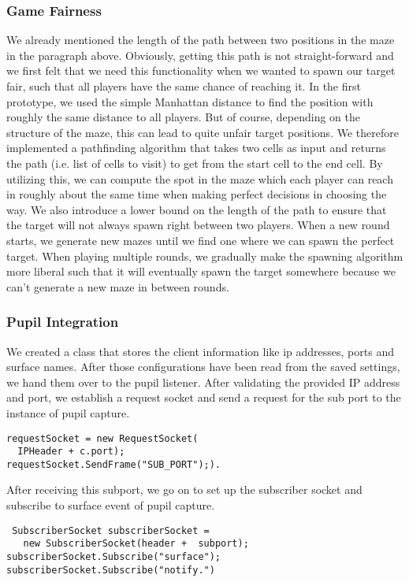 \documentclass{sigchi}
\begin{document}
\subsubsection{Game Fairness}
We already mentioned the length of the path between two positions in the maze in the paragraph above. Obviously, getting this path is not straight-forward and we first felt that we need this functionality when we wanted to spawn our target fair, such that all players have the same chance of reaching it. In the first prototype, we used the simple Manhattan distance to find the position with roughly the same distance to all players. But of course, depending on the structure of the maze, this can lead to quite unfair target positions. We therefore implemented a pathfinding algorithm that takes two cells as input and returns the path (i.e. list of cells to visit) to get from the start cell to the end cell. By utilizing this, we can compute the spot in the maze which each player can reach in roughly about the same time when making perfect decisions in choosing the way. We also introduce a lower bound on the length of the path to ensure that the target will not always spawn right between two players. When a new round starts, we generate new mazes until we find one where we can spawn the perfect target. When playing multiple rounds, we gradually make the spawning algorithm more liberal such that it will eventually spawn the target somewhere because we can't generate a new maze in between rounds.

\subsubsection{Pupil Integration}
We created a class that stores the client information like ip addresses, ports and surface names. After those configurations have been read from the saved settings, we hand them over to the pupil listener. After validating the provided IP address and port, we establish  a request socket and send a request for the sub port to the instance of pupil capture. 
\begin{verbatim}
requestSocket = new RequestSocket(
  IPHeader + c.port); 
requestSocket.SendFrame("SUB_PORT");).
\end{verbatim}


 After receiving this subport, we go on to set up the subscriber socket and subscribe to surface event of pupil capture. 
  \begin{verbatim}
 SubscriberSocket subscriberSocket = 
   new SubscriberSocket(header +  subport); 
subscriberSocket.Subscribe("surface");
subscriberSocket.Subscribe("notify.")
\end{verbatim}
 
\end{document}
